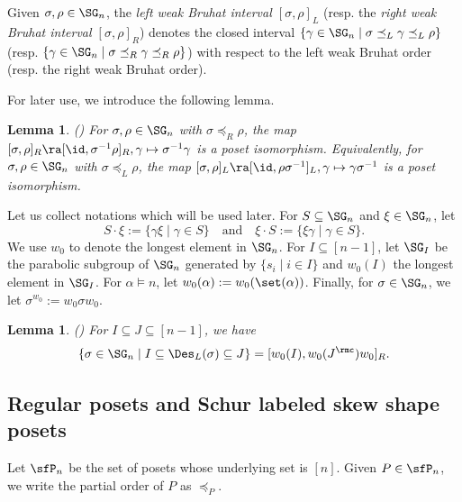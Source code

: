 \documentclass[12pt, reqno]{amsart}
\newtheorem{lemma}[theorem]{Lemma}
\theoremstyle{definition}
\numberwithin{equation}{section} \numberwithin{figure}{section}
\numberwithin{table}{section}
\begin{document}
Given $\sigma, \rho \in \SG_n$, the \emph{left weak Bruhat interval $[\sigma, \rho]_L$} (resp. the \emph{right weak Bruhat interval $[\sigma, \rho]_R$}) denotes the closed interval $\{\gamma \in \SG_n \mid \sigma \preceq_L \gamma \preceq_L \rho \}$ (resp. $\{\gamma \in \SG_n \mid \sigma \preceq_R \gamma \preceq_R \rho \}$) with respect to the left weak Bruhat order (resp. the right weak Bruhat order).

For later use, we introduce the following lemma.


\begin{lemma}{\rm (\cite[Proposition 3.1.6]{05BB})}
\label{lem: interval translation}
For $\sigma,\rho \in \SG_n$ with $\sigma \preceq_R \rho$, 
the map $[\sigma, \rho]_R \ra [\id, \sigma^{-1}\rho]_R, \gamma \mapsto \sigma^{-1} \gamma$ is a poset isomorphism.
Equivalently, for $\sigma,\rho \in \SG_n$ with $\sigma \preceq_L \rho$, the map $[\sigma,\rho]_L \ra [\id, \rho \sigma^{-1}]_L,\gamma \mapsto \gamma \sigma^{-1}$ is a poset isomorphism.
\end{lemma}








Let us collect notations which will be used later.
For $S \subseteq \SG_n$ and $\xi \in \SG_n$, let
\[
S \cdot \xi := \{\gamma \xi \mid \gamma \in S \} 
\quad \text{and} \quad 
\xi \cdot S := \{ \xi \gamma \mid \gamma \in S \}.
\]
We use $w_0$ to denote the longest element in $\SG_n$.
For $I \subseteq [n-1]$, let $\SG_{I}$ be the parabolic subgroup of $\SG_n$ generated by $\{s_i \mid i\in I\}$ and $w_0(I)$ the longest element in $\SG_{I}$.
For $\alpha \models n$, let $w_0(\alpha) := w_0(\set(\alpha))$.
Finally, for $\sigma \in \SG_n$, we let $\sigma^{w_0} := w_0 \sigma w_0$.

\begin{lemma}{\rm (\cite[Theorem 6.2]{88BW})}
\label{lem: same desc int}
For $I \subseteq J \subseteq [n-1]$, we have
\[
\{\sigma \in \SG_n \mid I \subseteq \Des_L(\sigma) \subseteq J\} = [w_0(I), w_0 (J^\rmc) w_0]_R.
\]
\end{lemma}









\subsection{Regular posets and Schur labeled skew shape posets}
\label{Regular posets and Schur labeled skew shape posets}
Let $\sfP_n$ be the set of posets whose underlying set is $[n]$.
Given $P \in \sfP_n$, we write the partial order of $P$ as $\preceq_P$.
\end{document}
